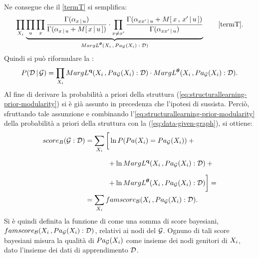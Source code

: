 Ne consegue che il \autoref{termT} si semplifica:
\[
\prod_{\setel{X}_i} \underbrace{\prod_{\setel{u}} \prod_{\setel{x}} \frac{\Gamma(\alpha_{\setel{x}\,\arrowvert\,\setel{u}})}{\Gamma(\alpha_{\setel{x}\,\arrowvert\,\setel{u}}+\mstat{x\,\arrowvert\,\setel{u}})} \cdot \prod_{\setel{x}\neq\setel{x}^\prime} \frac{\Gamma(\alpha_{\setel{x}\setel{x}^\prime\,\arrowvert\,\setel{u}}+\mstat[x]{\setel{x}^\prime\,\arrowvert\,\setel{u}})}{\Gamma(\alpha_{\setel{x}\setel{x}^\prime\,\arrowvert\,\setel{u}})}}_\text{$MargL^{\param{$\theta$}}(\setel{X}_i\,,Pa_{\conceptsym{G}}(\setel{X}_i):\conceptsym{D})$} \tag*{\ref{termT}} \text{.}
\]
Quindi si può riformulare la :
\begin{equation}\label{eq:data-given-graph}
P(\mathcal{D}\,\arrowvert\,\mathcal{G}) = \prod_{\mathnormal{X}_i} MargL^{\boldsymbol{\textbf{\text{q}}}}(\mathnormal{X}_i\,,Pa_{\mathcal{G}}(\mathnormal{X}_i):\mathcal{D}) \cdot MargL^{\boldsymbol{\textbf{\text{$\theta$}}}}(\mathnormal{X}_i\,,Pa_{\mathcal{G}}(\mathnormal{X}_i):\mathcal{D}) \text{.}
\end{equation}
Al fine di derivare la probabilità a priori della struttura (\autoref{eq:structurallearning-prior-modularity}) si è già assunto in precedenza che l'ipotesi di \emph{} sussista. Perciò, sfruttando tale assunzione e combinando l'\autoref{eq:structurallearning-prior-modularity} della probabilità a priori della struttura con la  (\autoref{eq:data-given-graph}), si ottiene:
\begin{align}\label{eq:bayesian-score}
score_B(\mathcal{G}:\mathcal{D}) &= \sum_{\mathnormal{X}_i} \bigg[ \ln{P(Pa(\mathnormal{X}_i)=Pa_{\mathcal{G}}(\mathnormal{X}_i))} + \bigg.\nonumber\\
& \qquad \quad \> \bigg.{} + \ln{MargL^{\boldsymbol{\textbf{\text{q}}}}(\mathnormal{X}_i\,,Pa_{\mathcal{G}}(\mathnormal{X}_i):\mathcal{D})} + \bigg.\nonumber\\
& \qquad \quad \> \bigg.{} + \ln{MargL^{\boldsymbol{\textbf{\text{$\theta$}}}}(\mathnormal{X}_i\,,Pa_{\mathcal{G}}(\mathnormal{X}_i):\mathcal{D})} \bigg] = \nonumber\\
&= \sum_{\mathnormal{X}_i} famscore_{\mathcal{B}}(\mathnormal{X}_i\,,Pa_{\mathcal{G}}(\mathnormal{X}_i):\mathcal{D}) \text{.}
\end{align}
Si è quindi definita la funzione di  come una somma di score bayesiani, $famscore_{\mathcal{B}}(\mathnormal{X}_i\,,Pa_{\mathcal{G}}(\mathnormal{X}_i):\mathcal{D})$, relativi ai nodi del  $\mathcal{G}$. Ognuno di tali score bayesiani misura la qualità di $Pa_{\mathcal{G}}(\mathnormal{X}_i)$ come insieme dei nodi genitori di $\mathnormal{X}_i$, dato l'insieme dei dati di apprendimento $\mathcal{D}$.

